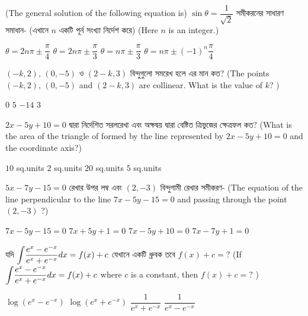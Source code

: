 \documentclass[addpoints]{exam}
\begin{document}
\begin{questions}
\question (The general solution of the following equation is) $ \sin\theta = \dfrac{1}{\sqrt{2}} $ সমীকরনের সাধারণ সমাধান- (এখানে $ n $ একটি পূর্ন সংখ্যা নির্দেশ করে) (Here $ n $ is an integer.)

\begin{oneparchoices}
\choice $ \theta = 2n\pi \pm\dfrac{\pi}{4} $
\choice $ \theta = 2n\pi \pm\dfrac{\pi}{3} $
\choice $ \theta = n\pi \pm\dfrac{\pi}{3} $
\choice $ \theta = n\pi \pm (-1)^{n}\dfrac{\pi}{4} $
\end{oneparchoices}

\question $ (-k,2),\, (0,-5) $ ও $ (2-k, 3) $ বিন্দুগুলো সমরেখ হলে এর মান কত? (The points $ (-k,2),\, (0,-5) $ and $ (2-k, 3) $ are collinear.  What is the value of $ k $? )


\begin{oneparchoices}
\choice $ 0 $
\choice $ 5 $
\choice $ -14 $
\choice $ 3 $
\end{oneparchoices}

\question $ 2x-5y +10=0$ দ্বারা নির্দেশিত সরলরেখা এবং অক্ষদ্বয় দ্বারা বেষ্টিত ত্রিভুজের ক্ষেত্রফল কত? (What is the area of the triangle of formed by the line represented by $ 2x-5y +10=0$ and the coordinate axis?)

\begin{oneparchoices}
\choice $ 10 $ sq.units
\choice $ 2 $ sq.units
\choice $ 20 $ sq.units
\choice $ 5 $ sq.units
\end{oneparchoices}

\question $ 5x-7y-15=0 $ রেখার উপর লম্ব এবং $ (2,-3) $ বিন্দুগামী রেখার সমীকরণ- (The equation of the line perpendicular to the line $ 7x-5y-15=0 $ and passing through the point $ (2,-3) $ ?)

\begin{oneparchoices}
\choice  $ 7x-5y-15=0 $
\choice  $ 7x+5y +1=0 $
\choice $ 7x-5y +10=0 $
\choice $ 7x-7y+1=0 $
\end{oneparchoices}

\question যদি $ \mathlarger{\int}\dfrac{e^{x}-e^{-x}}{e^{x}+e^{-x}}dx = f(x)+c $ যেখানে একটি ধ্রুবক তবে $ f(x)+c =? $ (If $ \mathlarger{\int}\dfrac{e^{x}-e^{-x}}{e^{x}+e^{-x}}dx = f(x)+c $ where $ c $ is a constant, then $ f(x)+c =? $ )


\begin{oneparchoices}
\choice  $ \log (e^{x}-e^{-x}) $
\choice  $ \log (e^{x}+e^{-x}) $
\choice  $ \dfrac{1}{e^{x}+e^{-x}} $
\choice  $ \dfrac{1}{e^{x}-e^{-x}} $
\end{oneparchoices}


\end{questions}
\end{document}
